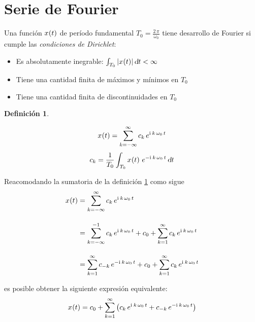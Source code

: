 \documentclass[a5paper,12pt,twoside]{book}
\newtheorem{defn}{{Definición}}[chapter]
\begin{document}
\section{Serie de Fourier}

Una función $\fx[x]{t}$ de período fundamental $T_0 = \frac{2 \, \pi}{\omega_0}$ tiene desarrollo de Fourier si cumple las \emph{condiciones de Dirichlet}:
\begin{itemize}
    \item Es absolutamente inegrable: $\int_{T_0} \norm{\fx[x]{t}} \, \dif t < \infty$
    \item Tiene una cantidad finita de máximos y mínimos en $T_0$
    \item Tiene una cantidad finita de discontinuidades en $T_0$
\end{itemize}

\begin{mdframed}[style=MyFrame1]
    \begin{defn}
        \label{defn:FourierSerieExp}
    \end{defn}
    \begin{equation*}
        \fx[x]{t} = \sum_{\kth=-\infty}^\infty c_\kth \, e^{\iu \, \kth \, \omega_0 \, t}
    \end{equation*}
    \begin{equation*}
        c_\kth = \frac{1}{T_0} \int_{T_0} \fx[x]{t} \, e^{-\iu \, \kth \, \omega_0 \, t} \, \dif t
    \end{equation*}
\end{mdframed}

Reacomodando la sumatoria de la definición \ref{defn:FourierSerieExp} como sigue
\begin{align*}
    \fx[x]{t} &=
    \sum_{\kth=-\infty}^\infty c_\kth \, e^{\iu \, \kth \, \omega_0 \, t}
    \\[1em]
    &= \sum_{\kth=-\infty}^{-1} c_\kth \, e^{\iu \, \kth \, \omega_0 \, t} + c_0 + \sum_{\kth=1}^{\infty} c_\kth \, e^{\iu \, \kth \, \omega_0 \, t}
    \\[1em]
    &= \sum_{\kth=1}^{\infty} c_{-\kth} \, e^{-\iu \, \kth \, \omega_0 \, t} + c_0 + \sum_{\kth=1}^{\infty} c_\kth \, e^{\iu \, \kth \, \omega_0 \, t}
\end{align*}

es posible obtener la siguiente expresión equivalente:
\begin{equation}
    \fx[x]{t} = c_0 + \sum_{\kth=1}^{\infty} \bb{ c_\kth \, e^{\iu \, \kth \, \omega_0 \, t} + c_{-\kth} \, e^{-\iu \, \kth \, \omega_0 \, t} }
    \label{eqn:FourierExpBis}
\end{equation}
\end{document}
